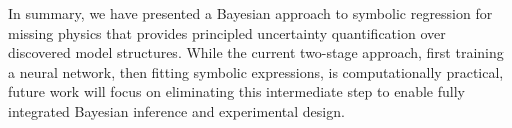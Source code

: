 \documentclass{ifacconf}
\begin{document}
	In summary, we have presented a Bayesian approach to symbolic regression for missing physics that provides principled uncertainty quantification over discovered model structures.
	While the current two-stage approach, first training a neural network, then fitting symbolic expressions, is computationally practical, future work will focus on eliminating this intermediate step to enable fully integrated Bayesian inference and experimental design.
	
\end{document}
